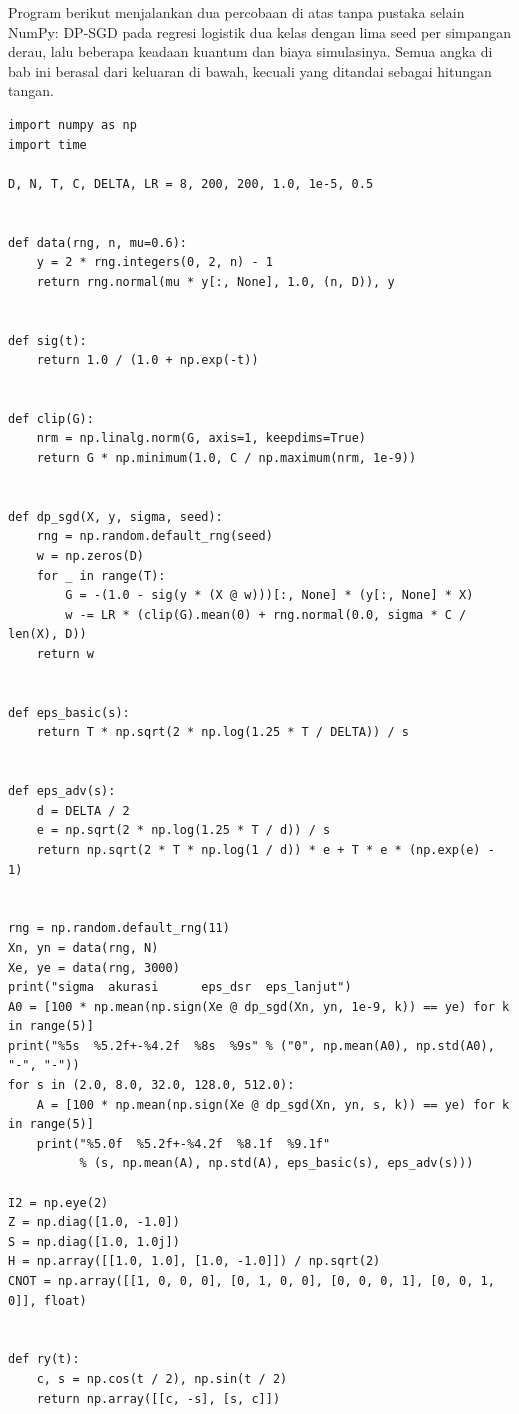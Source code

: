 Program berikut menjalankan dua percobaan di atas tanpa pustaka selain NumPy: DP-SGD
pada regresi logistik dua kelas dengan lima seed per simpangan derau, lalu beberapa
keadaan kuantum dan biaya simulasinya. Semua angka di bab ini berasal dari keluaran di
bawah, kecuali yang ditandai sebagai hitungan tangan.

\begin{lab}
\begin{verbatim}
import numpy as np
import time

D, N, T, C, DELTA, LR = 8, 200, 200, 1.0, 1e-5, 0.5


def data(rng, n, mu=0.6):
    y = 2 * rng.integers(0, 2, n) - 1
    return rng.normal(mu * y[:, None], 1.0, (n, D)), y


def sig(t):
    return 1.0 / (1.0 + np.exp(-t))


def clip(G):
    nrm = np.linalg.norm(G, axis=1, keepdims=True)
    return G * np.minimum(1.0, C / np.maximum(nrm, 1e-9))


def dp_sgd(X, y, sigma, seed):
    rng = np.random.default_rng(seed)
    w = np.zeros(D)
    for _ in range(T):
        G = -(1.0 - sig(y * (X @ w)))[:, None] * (y[:, None] * X)
        w -= LR * (clip(G).mean(0) + rng.normal(0.0, sigma * C / len(X), D))
    return w


def eps_basic(s):
    return T * np.sqrt(2 * np.log(1.25 * T / DELTA)) / s


def eps_adv(s):
    d = DELTA / 2
    e = np.sqrt(2 * np.log(1.25 * T / d)) / s
    return np.sqrt(2 * T * np.log(1 / d)) * e + T * e * (np.exp(e) - 1)


rng = np.random.default_rng(11)
Xn, yn = data(rng, N)
Xe, ye = data(rng, 3000)
print("sigma  akurasi      eps_dsr  eps_lanjut")
A0 = [100 * np.mean(np.sign(Xe @ dp_sgd(Xn, yn, 1e-9, k)) == ye) for k in range(5)]
print("%5s  %5.2f+-%4.2f  %8s  %9s" % ("0", np.mean(A0), np.std(A0), "-", "-"))
for s in (2.0, 8.0, 32.0, 128.0, 512.0):
    A = [100 * np.mean(np.sign(Xe @ dp_sgd(Xn, yn, s, k)) == ye) for k in range(5)]
    print("%5.0f  %5.2f+-%4.2f  %8.1f  %9.1f"
          % (s, np.mean(A), np.std(A), eps_basic(s), eps_adv(s)))

I2 = np.eye(2)
Z = np.diag([1.0, -1.0])
S = np.diag([1.0, 1.0j])
H = np.array([[1.0, 1.0], [1.0, -1.0]]) / np.sqrt(2)
CNOT = np.array([[1, 0, 0, 0], [0, 1, 0, 0], [0, 0, 0, 1], [0, 0, 1, 0]], float)


def ry(t):
    c, s = np.cos(t / 2), np.sin(t / 2)
    return np.array([[c, -s], [s, c]])



\end{verbatim}
\end{lab}

